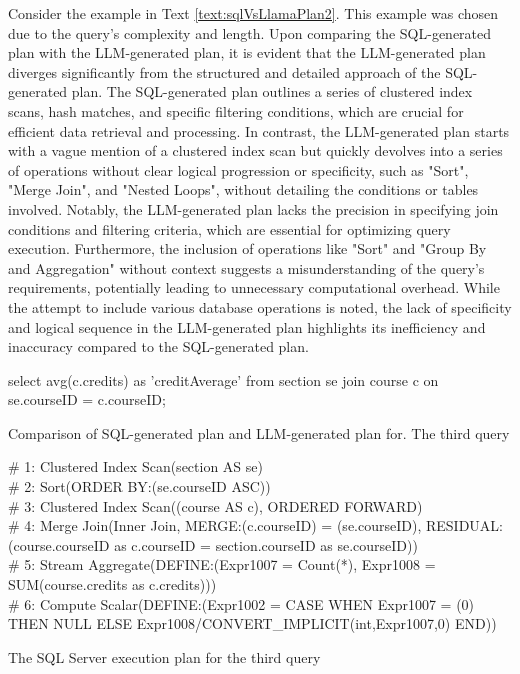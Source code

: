 Consider the example in Text \ref{text:sqlVsLlamaPlan2}. This example was chosen due to the query's complexity and length. Upon comparing the SQL-generated plan with the LLM-generated plan, it is evident that the LLM-generated plan diverges significantly from the structured and detailed approach of the SQL-generated plan. The SQL-generated plan outlines a series of clustered index scans, hash matches, and specific filtering conditions, which are crucial for efficient data retrieval and processing. In contrast, the LLM-generated plan starts with a vague mention of a clustered index scan but quickly devolves into a series of operations without clear logical progression or specificity, such as "Sort", "Merge Join", and "Nested Loops", without detailing the conditions or tables involved. Notably, the LLM-generated plan lacks the precision in specifying join conditions and filtering criteria, which are essential for optimizing query execution. Furthermore, the inclusion of operations like "Sort" and "Group By and Aggregation" without context suggests a misunderstanding of the query's requirements, potentially leading to unnecessary computational overhead. While the attempt to include various database operations is noted, the lack of specificity and logical sequence in the LLM-generated plan highlights its inefficiency and inaccuracy compared to the SQL-generated plan.

\begin{text}
  \ContinuedFloat*
  select avg(c.credits) as 'creditAverage' from section se join course c on se.courseID = c.courseID;
  \caption{Comparison of SQL-generated plan and LLM-generated plan for. The third query}
  \label{text:sqlVsLlamaPlan3}
\end{text}

\begin{text}
  \ContinuedFloat*
  \# 1: Clustered Index Scan(section AS se)\\
  \# 2: Sort(ORDER BY:(se.courseID ASC))\\
  \# 3: Clustered Index Scan((course AS c), ORDERED FORWARD)\\
  \# 4: Merge Join(Inner Join, MERGE:(c.courseID) = (se.courseID), RESIDUAL:(course.courseID as c.courseID = section.courseID as se.courseID))\\
  \# 5: Stream Aggregate(DEFINE:(Expr1007 = Count(*), Expr1008 = SUM(course.credits as c.credits)))\\
  \# 6: Compute Scalar(DEFINE:(Expr1002 = CASE WHEN Expr1007 = (0) THEN NULL ELSE Expr1008/CONVERT\_IMPLICIT(int,Expr1007,0) END))
  \caption{The SQL Server execution plan for the third query}
\end{text}

